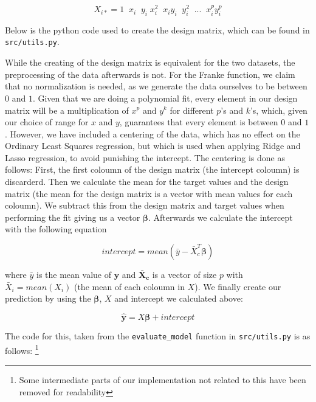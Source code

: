 \documentclass[twocolumn,10pt,cleanfoot]{asme2ej}
\begin{document}
\begin{equation}
X_{i*} = 1 \;\; x_i \;\; y_i \; x_i^2 \;\; x_i y_i \;\; y_i^2 \;\; ... \;\; x_i^p y_i^p
\end{equation}

	Below is the python code used to create the design matrix, which can be found in \texttt{src/utils.py}.



While the creating of the design matrix is equivalent for the two datasets, the preprocessing of the data afterwards is not. For the Franke function, we claim that no normalization is needed, as we generate the data ourselves to be between $0$ and $1$. Given that we are doing a polynomial fit, every element in our design matrix will be a multiplication of $x^p$ and $y^k$ for different $p$'s and $k$'s, which, given our choice of range for $x$ and $y$, guarantees that every element is between $0$ and $1$. However, we have included a centering of the data, which has no effect on the Ordinary Least Squares regression, but which is used when applying Ridge and Lasso regression, to avoid punishing the intercept. The centering is done as follows: First, the first coloumn of the design matrix (the intercept coloumn) is discarderd. Then we calculate the mean for the target values and the design matrix (the mean for the design matrix is a vector with mean values for each coloumn). We subtract this from the design matrix and target values when performing the fit giving us a vector $\bm{\beta}$. Afterwards we calculate the intercept with the following equation

\begin{equation}
	intercept = mean(\bar{y} - \bar{X}_c^T \bm{\beta})
\end{equation}

	where $\bar{y}$ is the mean value of $\bm{y}$ and $\bm{\bar{X}_c}$ is a vector of size $p$ with $\bar{X}_i = mean(X_i)$ (the mean of each coloumn in $X$). We finally create our prediction by using the $\bm{\beta}$, $X$ and intercept we calculated above:

\begin{equation}
	\bm{\hat{y}} = X \bm{\beta} + intercept
\end{equation}

The code for this, taken from the \texttt{evaluate\_model} function in \texttt{src/utils.py} is as follows: \footnote{Some intermediate parts of our implementation not related to this have been removed for readability}
\end{document}
